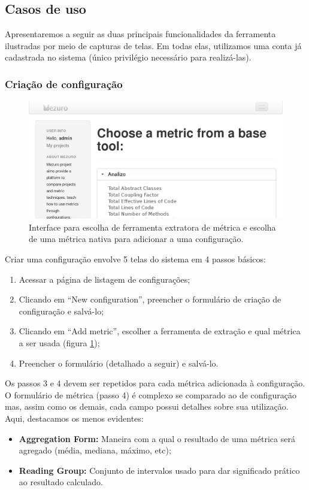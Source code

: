 \documentclass{llncs}
\begin{document}
  \subsection{Casos de uso}
  Apresentaremos a seguir as duas principais funcionalidades da ferramenta ilustradas por meio de capturas de telas. Em todas elas, utilizamos uma conta já cadastrada no sistema (único privilégio necessário para realizá-las).

    \subsubsection{Criação de configuração}
    \begin{figure}[H]
      \centering
      \includegraphics[width=\textwidth]{images/choose-metric.png}
      \caption{Interface para escolha de ferramenta extratora de métrica e escolha de uma métrica nativa para adicionar a uma configuração.}
      \label{fig:choose-metric}
    \end{figure}

    Criar uma configuração envolve 5 telas do sistema em 4 passos básicos:
    \begin{enumerate}
      \item Acessar a página de listagem de configurações;
      \item Clicando em ``New configuration'', preencher o formulário de criação de configuração e salvá-lo;
      \item Clicando em ``Add metric'', escolher a ferramenta de extração e qual métrica a ser usada (figura \ref{fig:choose-metric});
      \item Preencher o formulário (detalhado a seguir) e salvá-lo.
    \end{enumerate}

    Os passos 3 e 4 devem ser repetidos para cada métrica adicionada à configuração. O formulário de métrica (passo 4) é complexo se comparado ao de configuração mas, assim como os demais, cada campo possui detalhes sobre sua utilização. Aqui, destacamos os menos evidentes:
    \begin{itemize}
      \item \textbf{Aggregation Form:} Maneira com a qual o resultado de uma métrica será agregado (média, mediana, máximo, etc);
      \item \textbf{Reading Group:} Conjunto de intervalos usado para dar significado prático ao resultado calculado.
    \end{itemize}
\end{document}
